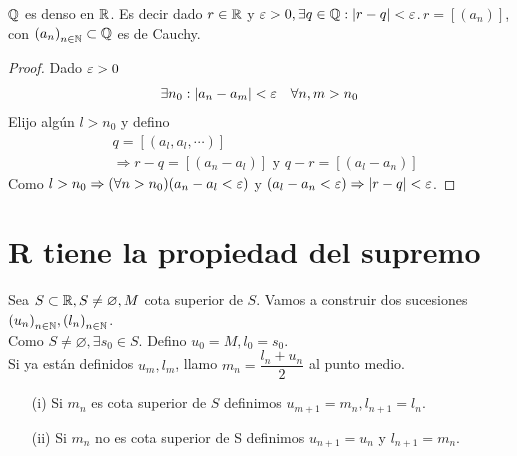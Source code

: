 \begin{theorem}
	\(\mathbb{Q} \) es denso en \(\mathbb{R} \). Es decir dado \(r \in \mathbb{R} \) y \(\varepsilon > 0, \exists q \in \mathbb{Q} : |r-q| < \varepsilon \).\( \, r = [(a_n)]\), con \({(a_n)}_{n \in \mathbb{N}} \subset \mathbb{Q} \) es de Cauchy.

	\begin{proof}
		Dado \( \varepsilon > 0 \)\begin{align*}
			\exists n_0 : |a_n - a_m| < \varepsilon \quad \forall n, m > n_0
		\end{align*}
		Elijo algún \( l > n_0 \) y defino \begin{align*}
			 & q = [(a_l, a_l, \cdots)]                                       \\
			 & \Rightarrow r-q = [(a_n - a_l)] \text{ y } q-r = [(a_l - a_n)]
		\end{align*}
		Como \( l > n_0 \Rightarrow (\forall n > n_0)(a_n-a_l < \varepsilon) \) y \( (a_l - a_n < \varepsilon) \Rightarrow |r-q| < \varepsilon \).
	\end{proof}
\end{theorem}

\section{R tiene la propiedad del supremo}

Sea \(S \subset \mathbb{R}, S \neq \varnothing, M\) cota superior de \(S\). Vamos a construir dos sucesiones \({(u_n)}_{n \in \mathbb{N}}, {(l_n)}_{n \in \mathbb{N}} \). \\
Como \(S \neq \varnothing, \exists s_0 \in S\). Defino \(u_0 = M, l_0 = s_0\). \\
Si ya están definidos \(u_m, l_m\), llamo \(m_n = \dfrac{l_n+u_n}{2} \) al punto medio.\begin{enumerate}
	\item[(i)] Si \(m_n\) es cota superior de \(S\) definimos \(u_{m+1} = m_n, l_{n+1} = l_n\).
	\item[(ii)] Si \(m_n\) no es cota superior de S definimos \(u_{n+1} = u_n\) y \(l_{n+1} = m_n\).
\end{enumerate}

